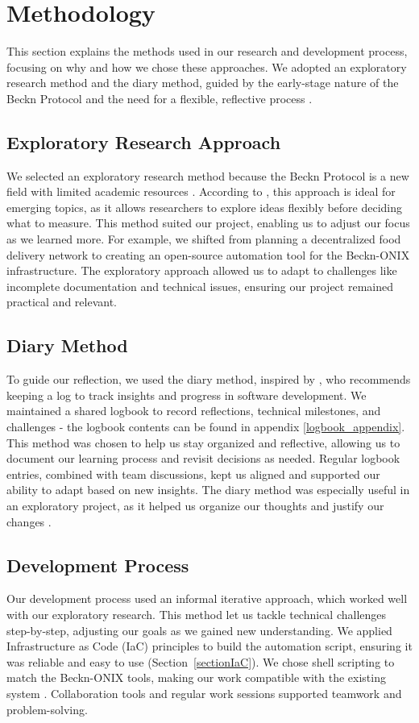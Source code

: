\section{Methodology}
\label{methodology}
This section explains the methods used in our research and development process, focusing on why and how we chose these approaches. We adopted an exploratory research method and the diary method, guided by the early-stage nature of the Beckn Protocol and the need for a flexible, reflective process \citep{winston2019exploratory}.

\subsection{Exploratory Research Approach}
We selected an exploratory research method because the Beckn Protocol is a new field with limited academic resources \citep{winston2019exploratory}. According to \citet{winston2019exploratory}, this approach is ideal for emerging topics, as it allows researchers to explore ideas flexibly before deciding what to measure. This method suited our project, enabling us to adjust our focus as we learned more. For example, we shifted from planning a decentralized food delivery network to creating an open-source automation tool for the Beckn-ONIX infrastructure. The exploratory approach allowed us to adapt to challenges like incomplete documentation and technical issues, ensuring our project remained practical and relevant.

\subsection{Diary Method}
To guide our reflection, we used the diary method, inspired by \citet{Naur1983}, who recommends keeping a log to track insights and progress in software development. We maintained a shared logbook to record reflections, technical milestones, and challenges - the logbook contents can be found in appendix \ref{logbook_appendix}. This method was chosen to help us stay organized and reflective, allowing us to document our learning process and revisit decisions as needed. Regular logbook entries, combined with team discussions, kept us aligned and supported our ability to adapt based on new insights. The diary method was especially useful in an exploratory project, as it helped us organize our thoughts and justify our changes \citep{Naur1983}.

\subsection{Development Process}
Our development process used an informal iterative approach, which worked well with our exploratory research. This method let us tackle technical challenges step-by-step, adjusting our goals as we gained new understanding. We applied Infrastructure as Code (IaC) principles to build the automation script, ensuring it was reliable and easy to use (Section~\ref{sectionIaC}). We chose shell scripting to match the Beckn-ONIX tools, making our work compatible with the existing system \citep{beck_onix_github}. Collaboration tools and regular work sessions supported teamwork and problem-solving.

